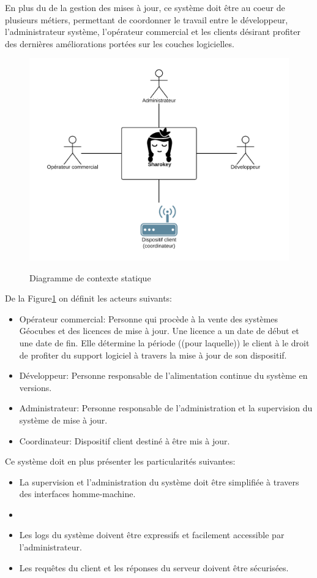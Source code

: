 \documentclass{themeensg}
\begin{document}
En plus du de la gestion des mises à jour, ce système doit être au coeur de plusieurs métiers, permettant de coordonner le travail entre le développeur, l'administrateur système, l'opérateur commercial et les clients désirant profiter des dernières améliorations portées sur les couches logicielles.

\begin{figure}[h!]
\includegraphics[scale=0.9]{images/context_general.png}
\label{fig:context_statique}
\centering
\caption{Diagramme de contexte statique}
\end{figure}

De la Figure\ref{fig:context_statique} on définit les acteurs suivants:
\begin{itemize}
\item Opérateur commercial: Personne qui procède à la vente des systèmes Géocubes et des licences de mise à jour. Une licence a un date de début et une date de fin. Elle détermine la période ((pour laquelle)) le client à le droit de profiter du support logiciel à travers la mise à jour de son dispositif.
\item Développeur: Personne responsable de l'alimentation continue du système en versions.
\item Administrateur: Personne responsable de l'administration et la supervision du système de mise à jour.
\item Coordinateur: Dispositif client destiné à être mis à jour.
\end{itemize}

Ce système doit en plus présenter les particularités suivantes:
\begin{itemize}
\item La supervision et l'administration du système doit être simplifiée à travers des interfaces homme-machine.
\item 
\item Les logs du système doivent être expressifs et facilement accessible par l'administrateur.
\item Les requêtes du client et les réponses du serveur doivent être sécurisées.

\end{itemize}
\end{document}
